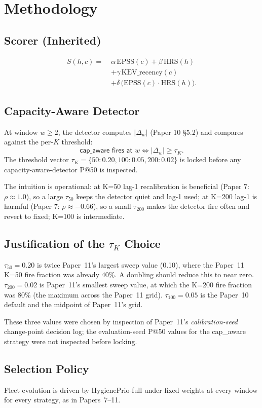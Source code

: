 \section{Methodology}

\subsection{Scorer (Inherited)}

\begin{equation}
\begin{aligned}
S(h,c) =\;& \alpha\,\mathrm{EPSS}(c) + \beta\,\mathrm{HRS}(h) \\
          & + \gamma\,\mathrm{KEV\_recency}(c) \\
          & + \delta\,\bigl(\mathrm{EPSS}(c) \cdot \mathrm{HRS}(h)\bigr).
\end{aligned}
\label{eq:hp}
\end{equation}

\subsection{Capacity-Aware Detector}

At window $w \geq 2$, the detector computes $|\Delta_w|$ (Paper 10
\S5.2) and compares against the per-$K$ threshold:
\begin{equation}
\textsf{cap\_aware fires at } w \iff |\Delta_w| \geq \tau_K.
\end{equation}
The threshold vector $\tau_K = \{50: 0.20, 100: 0.05, 200: 0.02\}$
is locked before any capacity-aware-detector P@50 is inspected.

The intuition is operational: at K=50 lag-1 recalibration is
beneficial (Paper 7: $\rho \approx 1.0$), so a large $\tau_{50}$
keeps the detector quiet and lag-1 used; at K=200 lag-1 is harmful
(Paper 7: $\rho \approx -0.66$), so a small $\tau_{200}$ makes the
detector fire often and revert to fixed; K=100 is intermediate.

\subsection{Justification of the $\tau_K$ Choice}

$\tau_{50} = 0.20$ is twice Paper~11's largest sweep value (0.10),
where the Paper~11 K=50 fire fraction was already 40\%. A doubling
should reduce this to near zero. $\tau_{200} = 0.02$ is Paper~11's
smallest sweep value, at which the K=200 fire fraction was 80\%
(the maximum across the Paper~11 grid). $\tau_{100} = 0.05$ is the
Paper~10 default and the midpoint of Paper~11's grid.

These three values were chosen by inspection of Paper~11's
\textit{calibration-seed} change-point decision log; the
evaluation-seed P@50 values for the cap\_aware strategy were not
inspected before locking.

\subsection{Selection Policy}

Fleet evolution is driven by HygienePrio-full under \textsf{fixed}
weights at every window for every strategy, as in Papers~7--11.
